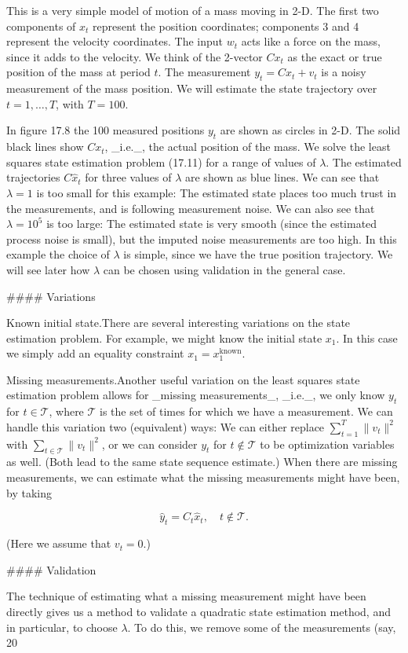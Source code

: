 This is a very simple model of motion of a mass moving in 2-D. The first two components of \(x_{t}\) represent the position coordinates; components 3 and 4 represent the velocity coordinates. The input \(w_{t}\) acts like a force on the mass, since it adds to the velocity. We think of the 2-vector \(Cx_{t}\) as the exact or true position of the mass at period \(t\). The measurement \(y_{t}=Cx_{t}+v_{t}\) is a noisy measurement of the mass position. We will estimate the state trajectory over \(t=1,\ldots,T\), with \(T=100\).

In figure 17.8 the 100 measured positions \(y_{t}\) are shown as circles in 2-D. The solid black lines show \(Cx_{t}\), _i.e._, the actual position of the mass. We solve the least squares state estimation problem (17.11) for a range of values of \(\lambda\). The estimated trajectories \(C\hat{x}_{t}\) for three values of \(\lambda\) are shown as blue lines. We can see that \(\lambda=1\) is too small for this example: The estimated state places too much trust in the measurements, and is following measurement noise. We can also see that \(\lambda=10^{5}\) is too large: The estimated state is very smooth (since the estimated process noise is small), but the imputed noise measurements are too high. In this example the choice of \(\lambda\) is simple, since we have the true position trajectory. We will see later how \(\lambda\) can be chosen using validation in the general case.

#### Variations

Known initial state.There are several interesting variations on the state estimation problem. For example, we might know the initial state \(x_{1}\). In this case we simply add an equality constraint \(x_{1}=x_{1}^{\text{known}}\).

Missing measurements.Another useful variation on the least squares state estimation problem allows for _missing measurements_, _i.e._, we only know \(y_{t}\) for \(t\in\mathcal{T}\), where \(\mathcal{T}\) is the set of times for which we have a measurement. We can handle this variation two (equivalent) ways: We can either replace \(\sum_{t=1}^{T}\|v_{t}\|^{2}\) with \(\sum_{t\in\mathcal{T}}\|v_{t}\|^{2}\), or we can consider \(y_{t}\) for \(t\not\in\mathcal{T}\) to be optimization variables as well. (Both lead to the same state sequence estimate.) When there are missing measurements, we can estimate what the missing measurements might have been, by taking

\[\hat{y}_{t}=C_{t}\hat{x}_{t},\quad t\not\in\mathcal{T}.\]

(Here we assume that \(v_{t}=0\).)

#### Validation

The technique of estimating what a missing measurement might have been directly gives us a method to validate a quadratic state estimation method, and in particular, to choose \(\lambda\). To do this, we remove some of the measurements (say, 20%

 